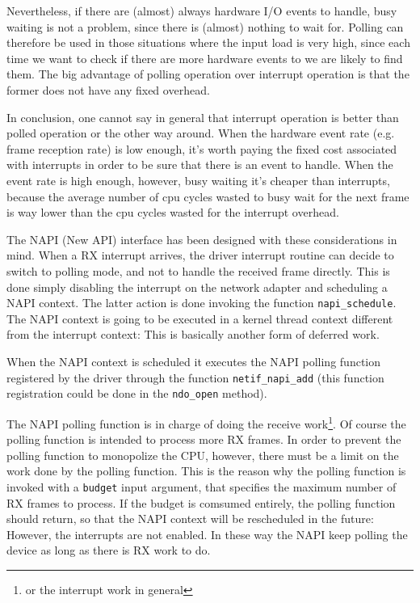 Nevertheless, if there are (almost) always hardware I/O events to handle, busy waiting is not a problem, since there is (almost) nothing to
wait for.
Polling can therefore be used in those situations where the input load is very high, since each time we want to check if there are more 
hardware events to we are likely to find them. The big advantage of polling operation over interrupt operation is that the former does
not have any fixed overhead.

\vspace{0.5cm}

In conclusion, one cannot say in general that interrupt operation is better than polled operation or the other way around. When the hardware
event rate (e.g. frame reception rate) is low enough, it's worth paying the fixed cost associated with interrupts in order to be sure that
there is an event to handle. When the event rate is high enough, however, busy waiting it's cheaper than interrupts, because the average 
number of cpu cycles wasted to busy wait for the next frame is way lower than the cpu cycles wasted for the interrupt overhead.

\vspace{0.5cm}

The NAPI (New API) interface has been designed with these considerations in mind. When a RX interrupt arrives, the driver interrupt routine
can decide to switch to polling mode, and not to handle the received frame directly.
This is done simply disabling the interrupt on the network adapter and scheduling a NAPI context. The latter action is done invoking the 
function \texttt{napi\_schedule}.
The NAPI context is going to be executed in a kernel thread context different from the interrupt context: This is basically another form
of deferred work.

When the NAPI context is scheduled it executes the NAPI polling function registered by the driver through the function 
\texttt{netif\_napi\_add} (this function registration could be done in the \texttt{ndo\_open} method).

The NAPI polling function is in charge of doing the receive work\footnote{or the interrupt work in general}. Of course the polling function
is intended to process more RX frames. In order to prevent the polling function to monopolize the CPU, however, there must be a limit on 
the work done by the polling function. This is the reason why the polling function is invoked with a \texttt{budget} input argument, that
specifies the maximum number of RX frames to process.
If the budget is comsumed entirely, the polling function should return, so that the NAPI context will be rescheduled in the future: However,
the interrupts are not enabled. In these way the NAPI keep polling the device as long as there is RX work to do.

